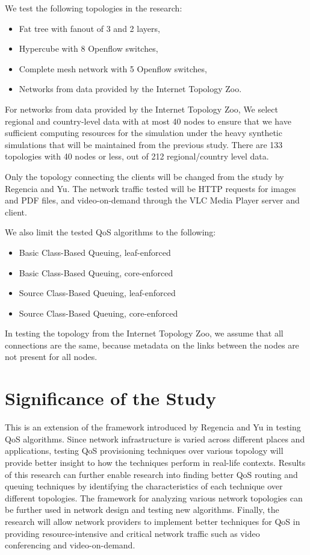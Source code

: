 We test the following topologies in the research:
\begin{itemize}
    \item Fat tree with fanout of 3 and 2 layers,
    \item Hypercube with 8 Openflow switches,
    \item Complete mesh network with 5 Openflow switches,
    \item Networks from data provided by the Internet Topology Zoo.
\end{itemize}

For networks from data provided by the Internet Topology Zoo, We select regional and country-level data with at most 40 nodes to ensure that we have sufficient computing resources for the simulation under the heavy synthetic simulations that will be maintained from the previous study. There are 133 topologies with 40 nodes or less, out of 212 regional/country level data. 

Only the topology connecting the clients will be changed from the study by Regencia and Yu. The network traffic tested will be HTTP requests for images and PDF files, and video-on-demand through the VLC Media Player server and client.
    
We also limit the tested QoS algorithms to the following:
\begin{itemize}
    \item Basic Class-Based Queuing, leaf-enforced
    \item Basic Class-Based Queuing, core-enforced
    \item Source Class-Based Queuing, leaf-enforced
    \item Source Class-Based Queuing, core-enforced
\end{itemize}

In testing the topology from the Internet Topology Zoo, we assume that all connections are the same, because metadata on the links between the nodes are not present for all nodes.

\section{Significance of the Study}

This is an extension of the framework introduced by Regencia and Yu in testing QoS algorithms. Since network infrastructure is varied across different places and applications, testing QoS provisioning techniques over various topology will provide better insight to how the techniques perform in real-life contexts. Results of this research can further enable research into finding better QoS routing and queuing techniques by identifying the characteristics of each technique over different topologies. The framework for analyzing various network topologies can be further used in network design and testing new algorithms. Finally, the research will allow network providers to implement better techniques for QoS in providing resource-intensive and critical network traffic such as video conferencing and video-on-demand.

